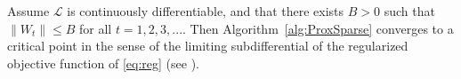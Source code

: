 \begin{proposition}\label{prop:outerloop_convergence}
    Assume $\mathcal{L}$ is continuously differentiable, and that there exists $B>0$ such that $\|W_t\| \leq B$ for all $t=1,2,3,...$. Then Algorithm~\ref{alg:ProxSparse} converges to a critical point in the sense of the limiting subdifferential of the regularized objective function of \eqref{eq:reg} (see \cite{RW1998}).
\end{proposition}



















